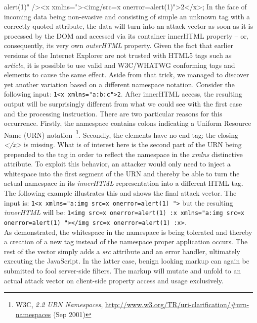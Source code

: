 \begin{itemize}
{     alert(1)" /><x xmlns="><img/src=x onerror=alert(1)">2</x>}; In the face of incoming data being non-evasive and consisting of simple an unknown tag with a correctly quoted attribute, the data will turn into an attack vector as soon as it is processed by the DOM and accessed via its container innerHTML property -- or, consequently, its very own \textit{outerHTML} property. Given the fact that earlier versions of the Internet Explorer are not trusted with HTML5 tags such as \textit{article}, it is possible to use valid and W3C/WHATWG conforming tags and elements to cause the same effect. Aside from that trick, we managed to discover yet another variation based on a different namespace notation. Consider the following input: \texttt{1<x xmlns="a:b:c">2}. After innerHTML access, the resulting output will be surprisingly different from what we could see with the first case and the processing instruction. There are two particular reasons for this occurrence. Firstly, the namespace contains colons indicating a 
Uniform Resource Name (URN) notation~\footnote{W3C, \textit{2.2 URN Namespaces}, \url{http://www.w3.org/TR/uri-clarification/#urn-namespaces} (Sep 2001)}. Secondly, the elements have no end tag; the closing \textit{</x>} is missing. What is of interest here is the second part of the URN being prepended to the tag in order to reflect the namespace in the \textit{xmlns} distinctive attribute. To exploit this behavior, an attacker would only need to inject a whitespace into the first segment of the URN and thereby be able to turn the actual namespace in its \textit{innerHTML} representation into a different HTML tag. The following example illustrates this and shows the final attack vector. The input is: \texttt{1<x xmlns="a:img src=x onerror=alert(1) ">} but the resulting \textit{innerHTML} will be: \texttt{1<img src=x onerror=alert(1) :x xmlns="a:img src=x onerror=alert(1) "></img src=x onerror=alert(1) :x>}. \\
     As demonstrated, the whitespace in the namespace is being tolerated and thereby a creation of a new tag instead of the namespace proper application occurs. The rest of the vector simply adds a \textit{src} attribute and an error handler, ultimately executing the JavaScript. In the latter case, benign looking markup can again be submitted to fool server-side filters. The markup will mutate and unfold to an actual attack vector on client-side property access and usage exclusively.
    \end{itemize}

